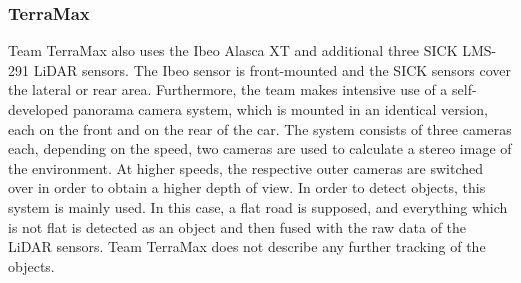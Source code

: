 \documentclass[11pt,oneside,openright]{mpreport}
\begin{document}
\subsubsection{TerraMax}
Team TerraMax \cite{Corp2005} also uses the Ibeo Alasca XT and additional three SICK LMS-291 LiDAR sensors. The Ibeo sensor is front-mounted and the SICK sensors 
cover the lateral or rear area. Furthermore, the team makes intensive use of a self-developed panorama camera system, which is mounted in an identical version, each
on the front and on the rear of the car. The system consists of three cameras each, depending on the speed, two cameras are used to calculate a stereo image of the environment.
At higher speeds, the respective outer cameras are switched over in order to obtain a higher depth of view. In order to detect objects, this system is mainly used.
In this case, a flat road is supposed, and everything which is not flat is detected as an object and then fused with the raw data of the LiDAR sensors. 
Team TerraMax does not describe any further tracking of the objects.
\end{document}
